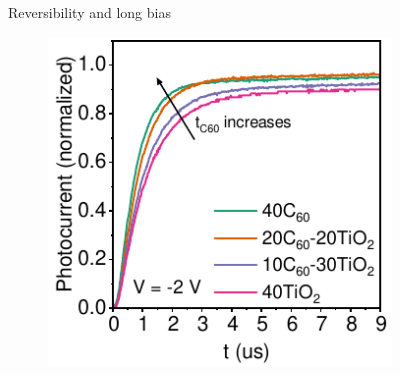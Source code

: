 \begin{figure}[htbp]
\begin{subfigure}[t]{0.45\textwidth}
        \caption{}
        \label{}
    \end{subfigure}

    \caption{Reversibility and long bias}
    \label{}
\end{figure}


\begin{figure}[t]
    \centering
    \begin{subfigure}[t]{0.42\textwidth}
        \centering
        \includegraphics[width=\textwidth]{chapters/transport_layers/images/TPC_comparison.pdf} %
        \caption{}
        \label{}
    \end{subfigure}
    \hfill
    \begin{subfigure}[t]{0.4\textwidth}
        \centering

\end{subfigure}
\end{figure}
